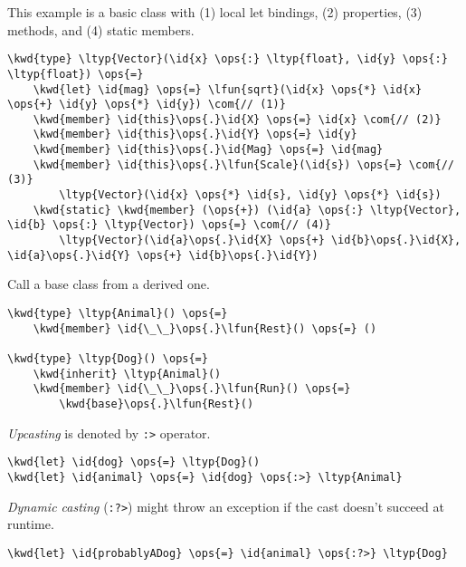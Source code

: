 \documentclass[10pt,landscape]{article}
\newcommand{\id}[1]{\textcolor[HTML]{000000}{#1}}
\newcommand{\kwd}[1]{\textcolor[HTML]{0000FF}{#1}}
\newcommand{\com}[1]{\textcolor[HTML]{008000}{#1}}
\newcommand{\ops}[1]{\textcolor[HTML]{000000}{#1}}
\newcommand{\ltyp}[1]{\textcolor[HTML]{2B91AF}{#1}}
\newcommand{\lfun}[1]{\textcolor[HTML]{0000A0}{#1}}
\begin{document}
\begin{multicols}{3}
This example is a basic class with (1) local let bindings, (2) properties, (3) methods, and (4) static members.
\begin{Verbatim}[commandchars=\\\{\}]
\kwd{type} \ltyp{Vector}(\id{x} \ops{:} \ltyp{float}, \id{y} \ops{:} \ltyp{float}) \ops{=}
    \kwd{let} \id{mag} \ops{=} \lfun{sqrt}(\id{x} \ops{*} \id{x} \ops{+} \id{y} \ops{*} \id{y}) \com{// (1)}
    \kwd{member} \id{this}\ops{.}\id{X} \ops{=} \id{x} \com{// (2)}
    \kwd{member} \id{this}\ops{.}\id{Y} \ops{=} \id{y}
    \kwd{member} \id{this}\ops{.}\id{Mag} \ops{=} \id{mag}
    \kwd{member} \id{this}\ops{.}\lfun{Scale}(\id{s}) \ops{=} \com{// (3)}
        \ltyp{Vector}(\id{x} \ops{*} \id{s}, \id{y} \ops{*} \id{s})
    \kwd{static} \kwd{member} (\ops{+}) (\id{a} \ops{:} \ltyp{Vector}, \id{b} \ops{:} \ltyp{Vector}) \ops{=} \com{// (4)}
        \ltyp{Vector}(\id{a}\ops{.}\id{X} \ops{+} \id{b}\ops{.}\id{X}, \id{a}\ops{.}\id{Y} \ops{+} \id{b}\ops{.}\id{Y})

\end{Verbatim}



Call a base class from a derived one.
\begin{Verbatim}[commandchars=\\\{\}]
\kwd{type} \ltyp{Animal}() \ops{=}
    \kwd{member} \id{\_\_}\ops{.}\lfun{Rest}() \ops{=} ()

\kwd{type} \ltyp{Dog}() \ops{=}
    \kwd{inherit} \ltyp{Animal}()
    \kwd{member} \id{\_\_}\ops{.}\lfun{Run}() \ops{=}
        \kwd{base}\ops{.}\lfun{Rest}()

\end{Verbatim}



\emph{Upcasting} is denoted by \texttt{:>} operator.
\begin{Verbatim}[commandchars=\\\{\}]
\kwd{let} \id{dog} \ops{=} \ltyp{Dog}() 
\kwd{let} \id{animal} \ops{=} \id{dog} \ops{:>} \ltyp{Animal}

\end{Verbatim}



\emph{Dynamic casting} (\texttt{:?>}) might throw an exception if the cast doesn't succeed at runtime.
\begin{Verbatim}[commandchars=\\\{\}]
\kwd{let} \id{probablyADog} \ops{=} \id{animal} \ops{:?>} \ltyp{Dog}

\end{Verbatim}


\end{multicols}
\end{document}
